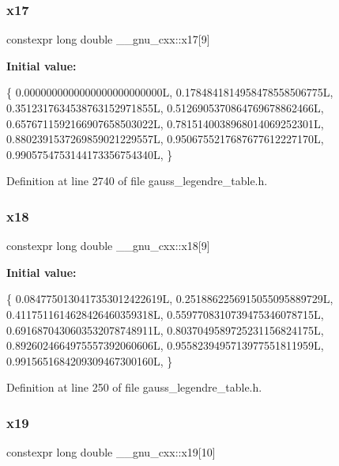 \subsubsection{\texorpdfstring{x17}{x17}}
{\footnotesize\ttfamily constexpr long double \+\_\+\+\_\+gnu\+\_\+cxx\+::x17\mbox{[}9\mbox{]}}

{\bfseries Initial value\+:}
\begin{DoxyCode}
\{
    0.0000000000000000000000000L,
    0.1784841814958478558506775L,
    0.3512317634538763152971855L,
    0.5126905370864769678862466L,
    0.6576711592166907658503022L,
    0.7815140038968014069252301L,
    0.8802391537269859021229557L,
    0.9506755217687677612227170L,
    0.9905754753144173356754340L,
  \}
\end{DoxyCode}


Definition at line 2740 of file gauss\+\_\+legendre\+\_\+table.\+h.

\mbox{\label{namespace____gnu__cxx_a1d3783e1b009706b624c1049e2c2accc}} 
\subsubsection{\texorpdfstring{x18}{x18}}
{\footnotesize\ttfamily constexpr long double \+\_\+\+\_\+gnu\+\_\+cxx\+::x18\mbox{[}9\mbox{]}}

{\bfseries Initial value\+:}
\begin{DoxyCode}
\{
    0.0847750130417353012422619L,
    0.2518862256915055095889729L,
    0.4117511614628426460359318L,
    0.5597708310739475346078715L,
    0.6916870430603532078748911L,
    0.8037049589725231156824175L,
    0.8926024664975557392060606L,
    0.9558239495713977551811959L,
    0.9915651684209309467300160L,
  \}
\end{DoxyCode}


Definition at line 250 of file gauss\+\_\+legendre\+\_\+table.\+h.

\mbox{\label{namespace____gnu__cxx_af4018be16a87db2b88864f1904aca944}} 
\subsubsection{\texorpdfstring{x19}{x19}}
{\footnotesize\ttfamily constexpr long double \+\_\+\+\_\+gnu\+\_\+cxx\+::x19\mbox{[}10\mbox{]}}

